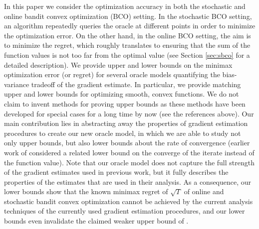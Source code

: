 In this paper we consider the optimization accuracy in both the stochastic and online bandit convex optimization (BCO) setting.
In the stochastic BCO setting, an algorithm repeatedly queries the oracle at different points in order to minimize the optimization error. On the other hand, in the online BCO setting, the aim is to minimize the regret, which roughly translates to ensuring that the sum of the function values is not too far from the optimal value (see Section \ref{sec:sbco} for a detailed description).
We  provide upper and lower bounds on the minimax optimization error (or regret) for several oracle models quantifying the bias-variance tradeoff of the gradient estimate. In particular, we provide matching upper and lower bounds for optimizing smooth, convex functions. We do not claim to invent methods for proving upper bounds as these methods have been developed for special cases for a long time by now (see the references above).
Our main contribution lies in abstracting away the properties of gradient estimation procedures
to create our new oracle model, in which we are able to study not only upper bounds, but also lower bounds about the rate of convergence
(earlier work of \citealt{Chen88:LB-AoS} considered a related lower bound on the converge of the iterate instead of the function value).
Note that our oracle model does not capture the full strength of the gradient estimates used in previous work, but it fully describes the properties of the estimates that are used in their analysis.
As a consequence, our lower bounds show that the known minimax regret of $\sqrt{T}$ \citep{BubeckDKP15,BuEl15}
of online and stochastic bandit convex optimization cannot be achieved by the current analysis techniques of the currently used gradient estimation procedures, and our lower bounds even invalidate the claimed weaker upper bound of \cite{DeElKo15}.


